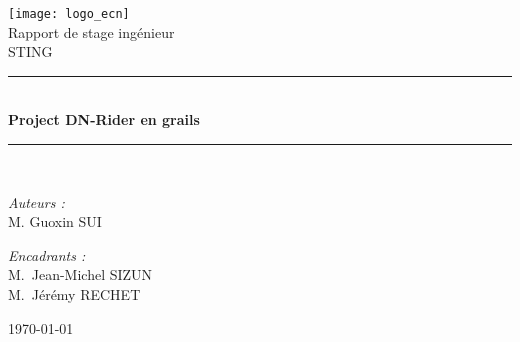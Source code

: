 \begin{titlepage}
\begin{center}

\texttt{[image: logo\_ecn]}\\[1cm]

{\large Rapport de stage ingénieur}\\[0.5cm]

{\large STING}\\[0.5cm]

\rule{\linewidth}{0.5mm} \\[0.4cm]
{ \huge \bfseries Project DN-Rider en grails \\[0.4cm] }
\rule{\linewidth}{0.5mm} \\[1.5cm]

\noindent
\begin{minipage}{0.4\textwidth}
  \begin{flushleft} \large
    \emph{Auteurs :}\\
    M. Guoxin \textsc{SUI}\\
  \end{flushleft}
\end{minipage}%
\begin{minipage}{0.4\textwidth}
  \begin{flushright} \large
    \emph{Encadrants :} \\
    M.~Jean-Michel \textsc{SIZUN}\\
    M.~Jérémy \textsc{RECHET}
  \end{flushright}
\end{minipage}

\vfill

{\large \today}

\end{center}
\end{titlepage}
